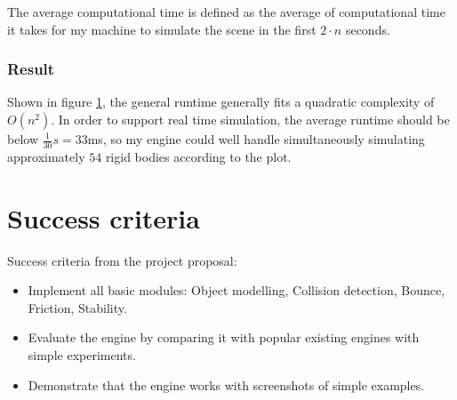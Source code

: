 \documentclass[12pt,a4paper,twoside,openright]{report}
\begin{document}
The average computational time is defined as the average of computational time 
it takes for my machine to simulate the scene in the first $2\cdot n$ seconds.

\subsubsection{Result}

\begin{figure}
    \captionsetup{labelsep=none}
    \begin{center}
    \end{center}
    \caption{}
    \label{ev01}
\end{figure}

Shown in figure \ref{ev01}, the general runtime generally fits a quadratic complexity of $O(n^2)$. In order to support real time simulation, the average runtime should be below $\frac{1}{30}s = 33$ms, so my engine could well handle simultaneously simulating approximately $54$ rigid bodies according to the plot.

\section{Success criteria}

Success criteria from the project proposal:

\begin{itemize}

\item Implement all basic modules: Object modelling, Collision detection, Bounce, Friction, Stability.

\item Evaluate the engine by comparing it with popular existing engines with simple experiments.

\item Demonstrate that the engine works with screenshots of simple examples.
\end{itemize}
\end{document}
